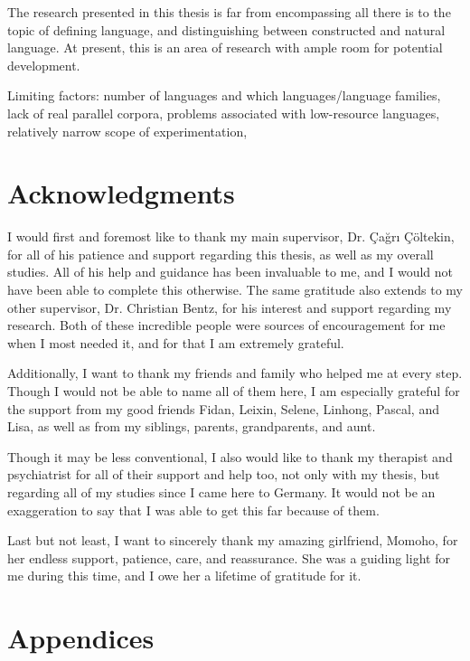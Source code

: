 \documentclass[12pt,a4paper]{article}
\numberwithin{figure}{section}
\numberwithin{table}{section}
\numberwithin{definition}{section}
\begin{document}
The research presented in this thesis is far from encompassing all there is to the topic of defining language, and distinguishing between constructed and natural language. At present, this is an area of research with ample room for potential development. 

Limiting factors: number of languages and which languages/language families, lack of real parallel corpora, problems associated with low-resource languages, relatively narrow scope of experimentation,

\newpage
\section{Acknowledgments}
\label{sec:acknowledgments}

I would first and foremost like to thank my main supervisor, Dr. Çağrı Çöltekin, for all of his patience and support regarding this thesis, as well as my overall studies. All of his help and guidance has been invaluable to me, and I would not have been able to complete this otherwise. The same gratitude also extends to my other supervisor, Dr. Christian Bentz, for his interest and support regarding my research. Both of these incredible people were sources of encouragement for me when I most needed it, and for that I am extremely grateful. 

Additionally, I want to thank my friends and family who helped me at every step. Though I would not be able to name all of them here, I am especially grateful for the support from my good friends Fidan, Leixin, Selene, Linhong, Pascal, and Lisa, as well as from my siblings, parents, grandparents, and aunt. 

Though it may be less conventional, I also would like to thank my therapist and psychiatrist for all of their support and help too, not only with my thesis, but regarding all of my studies since I came here to Germany. It would not be an exaggeration to say that I was able to get this far because of them.

Last but not least, I want to sincerely thank my amazing girlfriend, Momoho, for her endless support, patience, care, and reassurance. She was a guiding light for me during this time, and I owe her a lifetime of gratitude for it.

\newpage
\begingroup
\sloppy
\printbibliography
\endgroup

\newpage
\section{Appendices}
\label{sec:appendices}
\end{document}
